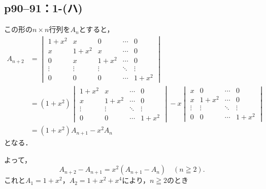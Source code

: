 \documentclass[a4paper,10pt,fleqn]{ltjsarticle}
\begin{document}
\subsection*{p90--91：1-(ハ)}

\begin{tleftbar}
    この形の$n\times n $行列を$A_n$とすると，
    \begin{align*}
        A_{n+2} & =
        \begin{vmatrix}
            1+x^2  & x      & 0      & \cdots & 0      \\
            x      & 1+x^2  & x      & \cdots & 0      \\
            0      & x      & 1+x^2  & \cdots & 0      \\
            \vdots & \vdots & \vdots & \ddots & \vdots \\
            0      & 0      & 0      & \cdots & 1+x^2
        \end{vmatrix} \\
                & = (1+x^2)
        \begin{vmatrix}
            1+x^2  & x      & \cdots & 0      \\
            x      & 1+x^2  & \cdots & 0      \\
            \vdots & \vdots & \ddots & \vdots \\
            0      & 0      & \cdots & 1+x^2
        \end{vmatrix}
        -x \begin{vmatrix}
               x      & 0      & \cdots & 0      \\
               x      & 1+x^2  & \cdots & 0      \\
               \vdots & \vdots & \ddots & \vdots \\
               0      & 0      & \cdots & 1+x^2
           \end{vmatrix}
        \\
                & = (1+x^2) A_{n+1} -x^2 A_n
    \end{align*}
    となる．

    よって，
    \[
        A_{n+2}-A_{n+1}=x^2 (A_{n+1}-A_n)\quad ( n \geqq 2) .
    \]
    これと$ A_1=1+x^2$，$ A_2 = 1+x^2 + x^4$により，$n \geqq 2$のとき


\end{tleftbar}
\end{document}

